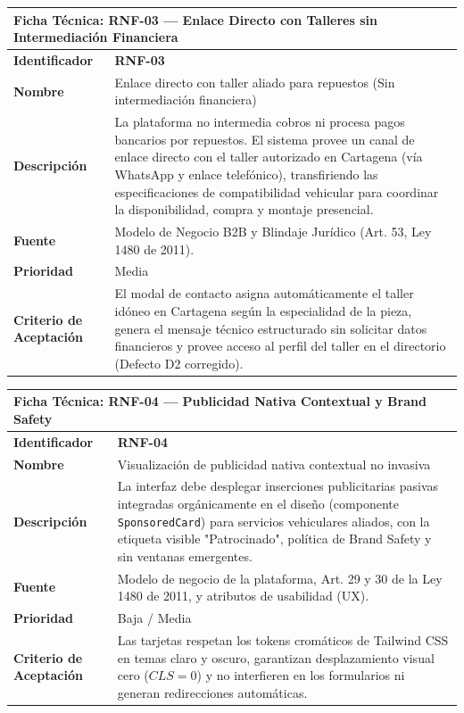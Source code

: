 \documentclass[11pt,letterpaper]{article}
\begin{document}
\newpage

\begin{table}[h!]
\centering
\small
\begin{tabularx}{\textwidth}{p{3.5cm}X}
\toprule
\multicolumn{2}{l}{\textbf{\color{darkblue}Ficha Técnica: RNF-03 — Enlace Directo con Talleres sin Intermediación Financiera}} \\
\midrule
\textbf{Identificador} & \textbf{RNF-03} \\
\textbf{Nombre} & Enlace directo con taller aliado para repuestos (Sin intermediación financiera) \\
\textbf{Descripción} & La plataforma no intermedia cobros ni procesa pagos bancarios por repuestos. El sistema provee un canal de enlace directo con el taller autorizado en Cartagena (vía WhatsApp y enlace telefónico), transfiriendo las especificaciones de compatibilidad vehicular para coordinar la disponibilidad, compra y montaje presencial. \\
\textbf{Fuente} & Modelo de Negocio B2B y Blindaje Jurídico (Art. 53, Ley 1480 de 2011). \\
\textbf{Prioridad} & Media \\
\textbf{Criterio de Aceptación} & El modal de contacto asigna automáticamente el taller idóneo en Cartagena según la especialidad de la pieza, genera el mensaje técnico estructurado sin solicitar datos financieros y provee acceso al perfil del taller en el directorio (Defecto D2 corregido). \\
\bottomrule
\end{tabularx}
\end{table}

\vspace{0.4cm}

\begin{table}[h!]
\centering
\small
\begin{tabularx}{\textwidth}{p{3.5cm}X}
\toprule
\multicolumn{2}{l}{\textbf{\color{darkblue}Ficha Técnica: RNF-04 — Publicidad Nativa Contextual y Brand Safety}} \\
\midrule
\textbf{Identificador} & \textbf{RNF-04} \\
\textbf{Nombre} & Visualización de publicidad nativa contextual no invasiva \\
\textbf{Descripción} & La interfaz debe desplegar inserciones publicitarias pasivas integradas orgánicamente en el diseño (componente \texttt{SponsoredCard}) para servicios vehiculares aliados, con la etiqueta visible "Patrocinado", política de Brand Safety y sin ventanas emergentes. \\
\textbf{Fuente} & Modelo de negocio de la plataforma, Art. 29 y 30 de la Ley 1480 de 2011, y atributos de usabilidad (UX). \\
\textbf{Prioridad} & Baja / Media \\
\textbf{Criterio de Aceptación} & Las tarjetas respetan los tokens cromáticos de Tailwind CSS en temas claro y oscuro, garantizan desplazamiento visual cero ($CLS = 0$) y no interfieren en los formularios ni generan redirecciones automáticas. \\
\bottomrule
\end{tabularx}
\end{table}
\end{document}
